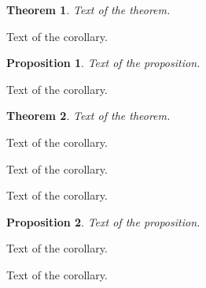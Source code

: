 \documentclass{article}
\newtheorem{theorem}{Theorem}
\newtheorem{proposition}{Proposition}
\begin{document}
\begin{theorem}
	Text of the theorem.
\end{theorem}

\begin{corollary}
	Text of the corollary.
\end{corollary}

\begin{proposition}
	Text of the proposition.
\end{proposition}

\begin{corollary}
	Text of the corollary.
\end{corollary}

\begin{theorem}
	Text of the theorem.
\end{theorem}

\begin{corollary}
	Text of the corollary.
\end{corollary}

\begin{corollary}
	Text of the corollary.
\end{corollary}

\begin{corollary}
	Text of the corollary.
\end{corollary}

\begin{proposition}
	Text of the proposition.
\end{proposition}

\begin{corollary}
	Text of the corollary.
\end{corollary}

\begin{corollary}
	Text of the corollary.
\end{corollary}
\end{document}
